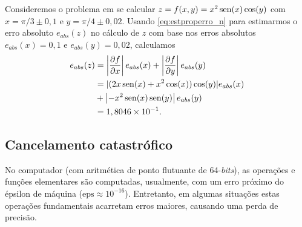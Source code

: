 \begin{ex}\label{ex:properro_2}
  Consideremos o problema em se calcular $z = f(x,y) = x^2\operatorname{sen}(x)\cos(y)$ com $x=\pi/3 \pm 0,1$ e $y=\pi/4 \pm 0,02$. Usando \eqref{eq:estproperro_n} para estimarmos o erro absoluto $e_{abs}(z)$ no cálculo de $z$ com base nos erros absolutos $e_{abs}(x)=0,1$ e $e_{abs}(y)=0,02$, calculamos
  \begin{align}
    e_{abs}(z) &= \left|\frac{\partial f}{\partial x}\right|e_{abs}(x) + \left|\frac{\partial f}{\partial y}\right|e_{abs}(y)\\
             &= |(2x\operatorname{sen}(x) + x^2\cos(x))\cos(y)|e_{abs}(x) \nonumber\\
               &+ \left|-x^2\operatorname{sen}(x)\operatorname{sen}(y)\right|e_{abs}(y)\\
             &= 1,8046\times 10^{-1}.
  \end{align}

% 
\end{ex}


\subsection{Cancelamento catastrófico}

No computador (com aritmética de ponto flutuante de 64-{\it bits}), as operações e funções elementares são computadas, usualmente, com um erro próximo do épsilon de máquina ($\mathrm{eps} \approx 10^{-16}$). Entretanto, em algumas situações estas operações fundamentais acarretam erros maiores, causando uma perda de precisão.

